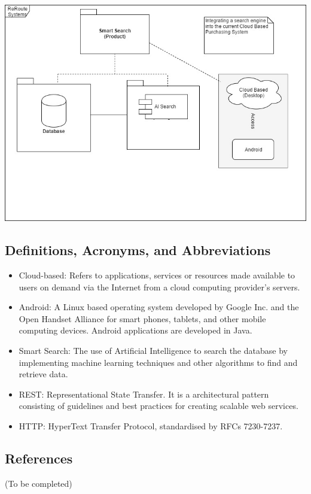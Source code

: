\documentclass[a4paper,10pt]{article}
\begin{document}
	\includegraphics[scale=0.60]{scope1.jpg}
	\subsection{Definitions, Acronyms, and Abbreviations} 

	\begin{itemize} 
	\item Cloud-based: Refers to applications, services or resources made available to users on demand via the Internet from a cloud computing provider's servers.
	\item Android: A Linux based operating system developed by Google Inc. and the Open Handset Alliance for smart phones, tablets, and other mobile computing devices. Android applications are developed in Java.
	\item Smart Search: The use of Artificial Intelligence to search the database by implementing machine learning techniques and other algorithms to find and retrieve data.
	\item REST: Representational State Transfer. It is a architectural pattern consisting of guidelines and best practices
for creating scalable web services.
	\item HTTP: HyperText Transfer Protocol, standardised by RFCs 7230-7237.
	\end{itemize}
	
	\subsection{References} 
	(To be completed)
	
\end{document}
